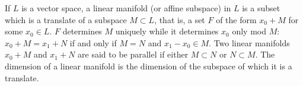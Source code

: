 If $L$ is a vector space, a linear manifold (or affine subspace) in $L$ is a subset which is a translate of a subspace $M \subset L$, that is, a set $F$ of the form $x_0 + M$ for some $x_0 \in L$. $F$ determines $M$ uniquely while it determines $x_0$ only mod $M$: $x_0 + M = x_1 + N$ if and only if $M = N$ and $x_1 - x_0 \in M$. Two linear manifolds $x_0 + M$ and $x_1 + N$ are said to be parallel if either $M \subset N$ or $N \subset M$. The dimension of a linear manifold is the dimension of the subspace of which it is a translate.
